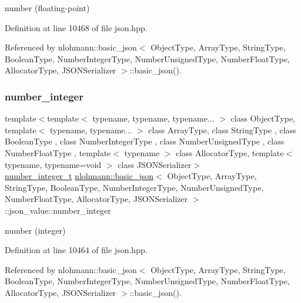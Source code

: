 number (floating-\/point) 



Definition at line 10468 of file json.\+hpp.



Referenced by nlohmann\+::basic\+\_\+json$<$ Object\+Type, Array\+Type, String\+Type, Boolean\+Type, Number\+Integer\+Type, Number\+Unsigned\+Type, Number\+Float\+Type, Allocator\+Type, J\+S\+O\+N\+Serializer $>$\+::basic\+\_\+json().

\mbox{\label{unionnlohmann_1_1basic__json_1_1json__value_afa3c414445aeffb56a7c6926f9420941}} 
\subsubsection{\texorpdfstring{number\+\_\+integer}{number\_integer}}
{\footnotesize\ttfamily template$<$template$<$ typename, typename, typename... $>$ class Object\+Type, template$<$ typename, typename... $>$ class Array\+Type, class String\+Type , class Boolean\+Type , class Number\+Integer\+Type , class Number\+Unsigned\+Type , class Number\+Float\+Type , template$<$ typename $>$ class Allocator\+Type, template$<$ typename, typename=void $>$ class J\+S\+O\+N\+Serializer$>$ \\
\hyperlink{classnlohmann_1_1basic__json_a98e611d67b7bd75307de99c9358ab2dc}{number\+\_\+integer\+\_\+t} \hyperlink{classnlohmann_1_1basic__json}{nlohmann\+::basic\+\_\+json}$<$ Object\+Type, Array\+Type, String\+Type, Boolean\+Type, Number\+Integer\+Type, Number\+Unsigned\+Type, Number\+Float\+Type, Allocator\+Type, J\+S\+O\+N\+Serializer $>$\+::json\+\_\+value\+::number\+\_\+integer}



number (integer) 



Definition at line 10464 of file json.\+hpp.



Referenced by nlohmann\+::basic\+\_\+json$<$ Object\+Type, Array\+Type, String\+Type, Boolean\+Type, Number\+Integer\+Type, Number\+Unsigned\+Type, Number\+Float\+Type, Allocator\+Type, J\+S\+O\+N\+Serializer $>$\+::basic\+\_\+json().

